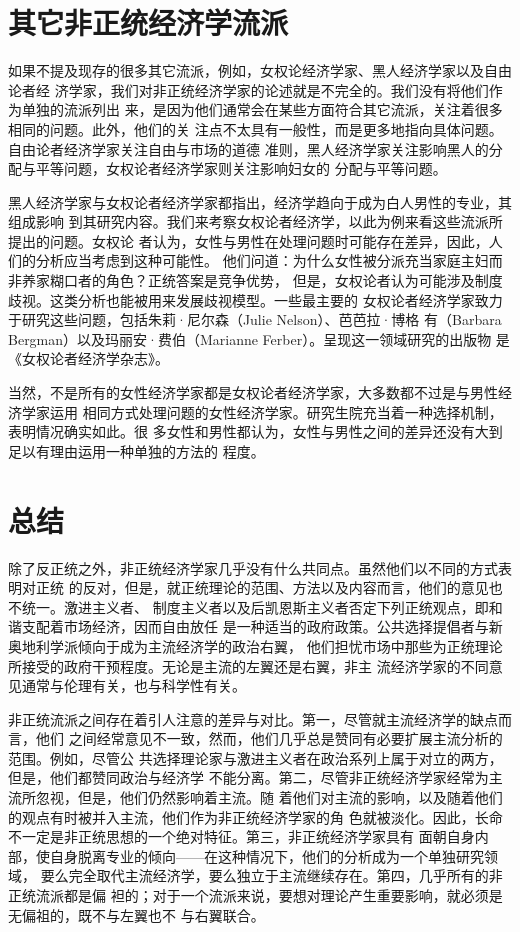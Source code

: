 \section{其它非正统经济学流派}

如果不提及现存的很多其它流派，例如，女权论经济学家、黑人经济学家以及自由论者经
济学家，我们对非正统经济学家的论述就是不完全的。我们没有将他们作为单独的流派列出
来，是因为他们通常会在某些方面符合其它流派，关注着很多相同的问题。此外，他们的关
注点不太具有一般性，而是更多地指向具体问题。自由论者经济学家关注自由与市场的道德
准则，黑人经济学家关注影响黑人的分配与平等问题，女权论者经济学家则关注影响妇女的
分配与平等问题。

黑人经济学家与女权论者经济学家都指出，经济学趋向于成为白人男性的专业，其组成影响
到其研究内容。我们来考察女权论者经济学，以此为例来看这些流派所提出的问题。女权论
者认为，女性与男性在处理问题时可能存在差异，因此，人们的分析应当考虑到这种可能性。
他们问道：为什么女性被分派充当家庭主妇而非养家糊口者的角色？正统答案是竞争优势，
但是，女权论者认为可能涉及制度歧视。这类分析也能被用来发展歧视模型。一些最主要的
女权论者经济学家致力于研究这些问题，包括朱莉·尼尔森（Julie Nelson）、芭芭拉·博格
有（Barbara Bergman）以及玛丽安·费伯（Marianne Ferber）。呈现这一领域研究的出版物
是《女权论者经济学杂志》。

当然，不是所有的女性经济学家都是女权论者经济学家，大多数都不过是与男性经济学家运用
相同方式处理问题的女性经济学家。研究生院充当着一种选择机制，表明情况确实如此。很
多女性和男性都认为，女性与男性之间的差异还没有大到足以有理由运用一种单独的方法的
程度。

\section{总结}

除了反正统之外，非正统经济学家几乎没有什么共同点。虽然他们以不同的方式表明对正统
的反对，但是，就正统理论的范围、方法以及内容而言，他们的意见也不统一。激进主义者、
制度主义者以及后凯恩斯主义者否定下列正统观点，即和谐支配着市场经济，因而自由放任
是一种适当的政府政策。公共选择提倡者与新奥地利学派倾向于成为主流经济学的政治右翼，
他们担忧市场中那些为正统理论所接受的政府干预程度。无论是主流的左翼还是右翼，非主
流经济学家的不同意见通常与伦理有关，也与科学性有关。

非正统流派之间存在着引人注意的差异与对比。第一，尽管就主流经济学的缺点而言，他们
之间经常意见不一致，然而，他们几乎总是赞同有必要扩展主流分析的范围。例如，尽管公
共选择理论家与激进主义者在政治系列上属于对立的两方，但是，他们都赞同政治与经济学
不能分离。第二，尽管非正统经济学家经常为主流所忽视，但是，他们仍然影响着主流。随
着他们对主流的影响，以及随着他们的观点有时被并入主流，他们作为非正统经济学家的角
色就被淡化。因此，长命不一定是非正统思想的一个绝对特征。第三，非正统经济学家具有
面朝自身内部，使自身脱离专业的倾向——在这种情况下，他们的分析成为一个单独研究领域，
要么完全取代主流经济学，要么独立于主流继续存在。第四，几乎所有的非正统流派都是偏
袒的；对于一个流派来说，要想对理论产生重要影响，就必须是无偏祖的，既不与左翼也不
与右翼联合。

